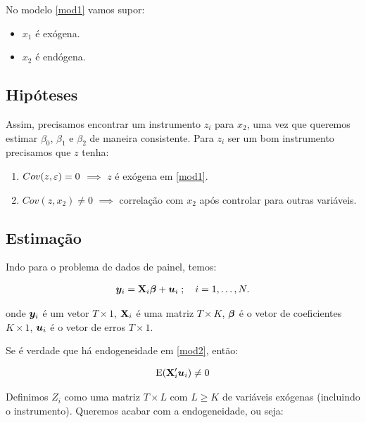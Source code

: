 \documentclass[11pt, oneside, a4paper, article]{article}
\numberwithin{equation}{section}
\begin{document}
\begin{description}
No modelo \eqref{mod1} vamos supor:

\begin{itemize}\itemsep0pt
\item $x_{1}$ é exógena.
\item $x_{2}$ é endógena.
\end{itemize}

\subsection{Hipóteses}

Assim, precisamos encontrar um instrumento $z_{i}$ para $x_{2}$, uma vez que queremos estimar $\beta_{0}$, $\beta_{1}$ e $\beta_{2}$ de maneira consistente.
Para $z_{i}$ ser um bom instrumento precisamos que $z$ tenha:

\begin{enumerate}\itemsep0pt
\item $Cov(z, \varepsilon) = 0$ $\implies$  $z$ é exógena em \eqref{mod1}.
\item $Cov(z, x_{2}) \neq 0$ $\implies$  correlação com $x_{2}$ após controlar para outras variáveis.
\end{enumerate}

\subsection{Estimação}

Indo para o problema de dados de painel, temos:

\vspace{-1 em}
\begin{align} \label{mod2}
\boldsymbol{y}_{i} = \mathbf{X}_{i} \boldsymbol{\beta} + \boldsymbol{u}_{i}
\; ; \quad i = 1, \dots, N.
\end{align}

\noindent
onde 
$\boldsymbol{y}_{i}$ é um vetor $T \times 1$,
$\mathbf{X}_{i}$ é uma matriz $T \times K$,
$\boldsymbol{\beta}$ é o vetor de coeficientes $K \times 1$,
$\boldsymbol{u}_{i}$ é o vetor de erros $T \times 1$.

Se é verdade que há endogeneidade em \eqref{mod2}, então:

\vspace{-1 em}
\begin{align*}
\text{E}(\mathbf{X}_{i}^{\prime} \boldsymbol{u}_{i}) \neq 0
\end{align*}

Definimos $Z_{i}$ como uma matriz $T \times L$ com $L \geq K$ de variáveis exógenas (incluindo o instrumento).
Queremos acabar com a endogeneidade, ou seja:


\end{description}
\end{document}

